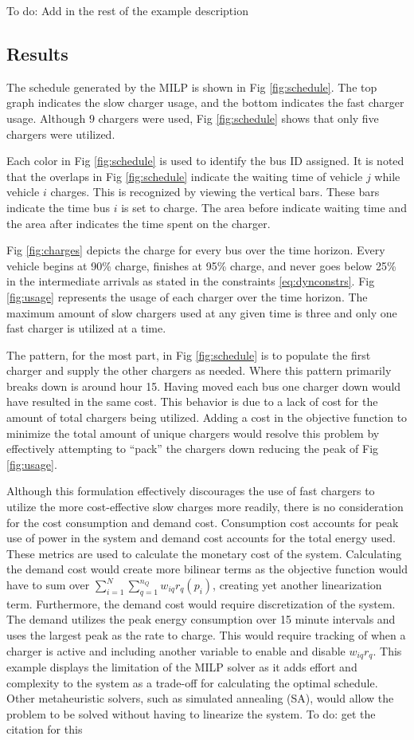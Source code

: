 \documentclass[utf8]{FrontiersinHarvard}
\newcommand{\TODO}[1]{{\color{green} To do: #1}}                                %
\begin{document}
\TODO{Add in the rest of the example description}

\subsection{Results}
The schedule generated by the MILP is shown in Fig \ref{fig:schedule}. The top graph indicates the slow charger usage,
and the bottom indicates the fast charger usage. Although $9$ chargers were used, Fig \ref{fig:schedule} shows that only
five chargers were utilized.

Each color in Fig \ref{fig:schedule} is used to identify the bus ID assigned. It is noted that the overlaps in Fig
\ref{fig:schedule} indicate the waiting time of vehicle $j$ while vehicle $i$ charges. This is recognized by viewing the
vertical bars. These bars indicate the time bus $i$ is set to charge. The area before indicate waiting time and the area
after indicates the time spent on the charger.

Fig \ref{fig:charges} depicts the charge for every bus over the time horizon. Every vehicle begins at 90\% charge,
finishes at 95\% charge, and never goes below 25\% in the intermediate arrivals as stated in the constraints
\eqref{eq:dynconstrs}. Fig \ref{fig:usage} represents the usage of each charger over the time horizon. The maximum
amount of slow chargers used at any given time is three and only one fast charger is utilized at a time.

The pattern, for the most part, in Fig \ref{fig:schedule} is to populate the first charger and supply the other chargers
as needed. Where this pattern primarily breaks down is around hour 15. Having moved each bus one charger down would have
resulted in the same cost. This behavior is due to a lack of cost for the amount of total chargers being utilized.
Adding a cost in the objective function to minimize the total amount of unique chargers would resolve this problem by
effectively attempting to ``pack'' the chargers down reducing the peak of Fig \ref{fig:usage}.

Although this formulation effectively discourages the use of fast chargers to utilize the more cost-effective slow
charges more readily, there is no consideration for the cost consumption and demand cost. Consumption cost accounts for
peak use of power in the system and demand cost accounts for the total energy used. These metrics are used to calculate
the monetary cost of the system. Calculating the demand cost would create more bilinear terms as the objective function
would have to sum over $\sum_{i=1}^N \sum_{q=1}^{n_Q} w_{iq}{r_q}(p_i)$, creating yet another linearization term. Furthermore,
the demand cost would require discretization of the system. The demand utilizes the peak energy consumption over 15
minute intervals and uses the largest peak as the rate to charge. This would require tracking of when a charger is
active and including another variable to enable and disable $w_{iq}r_q$. This example displays the limitation of the
MILP solver as it adds effort and complexity to the system as a trade-off for calculating the optimal schedule. Other
metaheuristic solvers, such as simulated annealing (SA), would allow the problem to be solved without having to
linearize the system. \TODO{get the citation for this}
\end{document}
